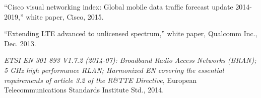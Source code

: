 
\begin{thebibliography}{99.}%
``Cisco visual networking index: Global mobile data traffic forecast update 2014-2019,'' white paper, Cisco, 2015.	
	
``Extending {LTE} advanced to unlicensed spectrum,'' white paper, Qualcomm Inc., Dec. 2013.

 \emph{ETSI EN 301 893 V1.7.2 (2014-07): Broadband Radio Access Networks (BRAN);	5 GHz high performance RLAN; Harmonized EN covering the essential requirements of article 3.2 of the R\&TTE Directive}, European Telecommunications Standards Institute Std., 2014.	
	
%
\end{thebibliography}
